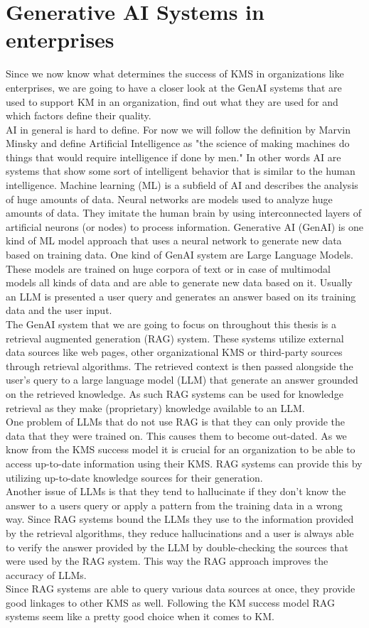 \documentclass[
	english,
	ruledheaders=section,%
	class=report,%
	thesis={type=bachelor},%
	accentcolor=1b,%
	custommargins=true,%
	marginpar=false,%
	parskip=half-,%
	fontsize=11pt,%
	DIV=14,
]{tudapub}
\begin{document}
\section{Generative AI Systems in enterprises}
Since we now know what determines the success of KMS in organizations like enterprises, we are going to have a closer look at the GenAI systems that are used to support KM in an organization, find out what they are used for and which factors define their quality.\\
AI in general is hard to define. For now we will follow the definition by Marvin Minsky and define Artificial Intelligence as "the science of making machines do things that would require intelligence if done by men." In other words AI are systems that show some sort of intelligent behavior that is similar to the human intelligence. Machine learning (ML) is a subfield of AI and describes the analysis of huge amounts of data. Neural networks are models used to analyze huge amounts of data. They imitate the human brain by using interconnected layers of artificial neurons (or nodes) to process information. Generative AI (GenAI) is one kind of ML model approach that uses a neural network to generate new data based on training data.
One kind of GenAI system are Large Language Models. These models are trained on huge corpora of text or in case of multimodal models all kinds of data and are able to generate new data based on it. Usually an LLM is presented a user query and generates an answer based on its training data and the user input.\\
The GenAI system that we are going to focus on throughout this thesis is a retrieval augmented generation (RAG) system. These systems utilize external data sources like web pages, other organizational KMS or third-party sources through retrieval algorithms. The retrieved context is then passed alongside the user's query to a large language model (LLM) that generate an answer grounded on the retrieved knowledge. As such RAG systems can be used for knowledge retrieval as they make (proprietary) knowledge available to an LLM.\\
One problem of LLMs that do not use RAG is that they can only provide the data that they were trained on. This causes them to become out-dated. As we know from the KMS success model it is crucial for an organization to be able to access up-to-date information using their KMS. RAG systems can provide this by utilizing up-to-date knowledge sources for their generation.\\
Another issue of LLMs is that they tend to hallucinate if they don't know the answer to a users query or apply a pattern from the training data in a wrong way. Since RAG systems bound the LLMs they use to the information provided by the retrieval algorithms, they reduce hallucinations and a user is always able to verify the answer provided by the LLM by double-checking the sources that were used by the RAG system. This way the RAG approach improves the accuracy of LLMs.\\
Since RAG systems are able to query various data sources at once, they provide good linkages to other KMS as well. Following the KM success model RAG systems seem like a pretty good choice when it comes to KM.\\
\end{document}
